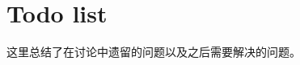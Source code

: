 \documentclass{project-log}
\begin{document}
\newpage
\appendix

\section{Todo list}
\begin{Note}{}
\centering 这里总结了在讨论中遗留的问题以及之后需要解决的问题。
\end{Note}

\AddListOfTodos
\newpage

\end{document}
